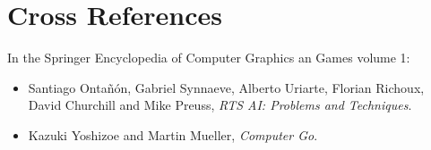 \documentclass{llncs}
\begin{document}
\section*{Cross References}
In the Springer Encyclopedia of Computer Graphics an Games volume 1:
\begin{itemize}
\item  Santiago Ontañón,  Gabriel Synnaeve,  Alberto Uriarte,  Florian
  Richoux, David Churchill and Mike Preuss, {\it RTS AI: Problems and Techniques}.
\item Kazuki Yoshizoe and Martin Mueller, {\it Computer Go}.
\end{itemize}



\end{document}
